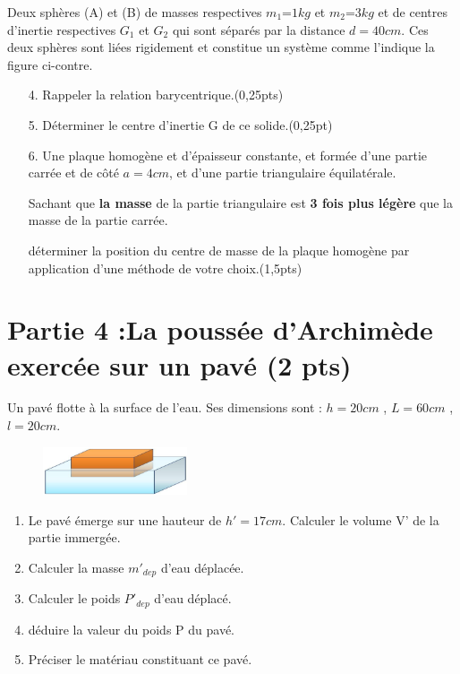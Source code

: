 \documentclass[12pt]{article}
\begin{document}
Deux sphères (A) et (B) de masses respectives $m_1$=$1kg$ et $m_2$=$3kg$ et de centres d’inertie respectives $G_1$ et $G_2$ qui sont séparés par la distance $d = 40 cm$. Ces deux sphères sont liées rigidement et constitue un système comme l’indique la figure ci-contre.

\begin{enumerate}

	\item[4.] Rappeler la relation barycentrique.\dotfill(0,25pts)
	\item[5.] Déterminer le centre d’inertie G de ce solide.\dotfill(0,25pt)
	\item[6.] Une plaque homogène et d’épaisseur constante, et formée d’une partie carrée et de côté $a=4cm$, et d’une partie triangulaire équilatérale.

	Sachant que \textbf{la masse} de la partie triangulaire est \textbf{3 fois plus légère} que la masse de la partie carrée.

	déterminer la position du centre de masse de la plaque homogène par application d’une méthode de votre choix.\dotfill(1,5pts)
\end{enumerate}

 \section*{Partie 4 :La poussée d'Archimède exercée sur un pavé \dotfill(2 pts)}
Un pavé flotte à la surface de l’eau. Ses dimensions sont : $h = 20 cm$ ,  $L = 60 cm$ ,  $l = 20 cm$.

\begin{figure}
	\vspace{-4.3cm}

	
 \begin{center}
	 \hspace{-3cm}	\includegraphics[width=0.38\textwidth]{./img/img01.png}
\end{center}
\end{figure}
\begin{enumerate}
	\item  Le pavé émerge sur une hauteur de $h' = 17 cm$. Calculer le volume V' de la partie immergée.

	\item  Calculer la masse $m'_{dep}$ d’eau déplacée.
	\item  Calculer le poids $P'_{dep}$ d’eau déplacé.
	\item  déduire la valeur du poids P du pavé.
	\item  Préciser le matériau constituant ce pavé.\dotfill{1pt}
\end{enumerate}
\end{document}
